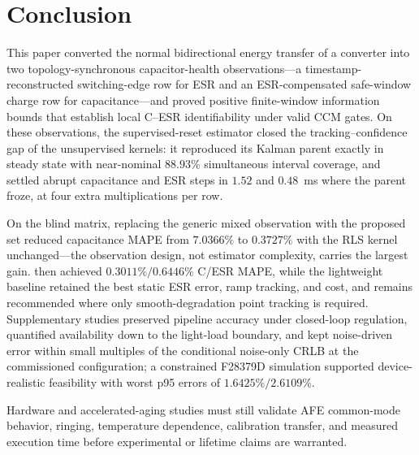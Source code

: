 \section{Conclusion}
\label{sec:conclusion}

This paper converted the normal bidirectional energy transfer of a \Cuk{} converter into two topology-synchronous capacitor-health observations---a timestamp-reconstructed switching-edge row for ESR and an ESR-compensated safe-window charge row for capacitance---and proved positive finite-window information bounds that establish local C--ESR identifiability under valid CCM gates. On these observations, the supervised-reset estimator \TSSRKE{} closed the tracking--confidence gap of the unsupervised kernels: it reproduced its Kalman parent exactly in steady state with near-nominal $88.93\%$ simultaneous interval coverage, and settled abrupt capacitance and ESR steps in $1.52$ and $0.48$~ms where the parent froze, at four extra multiplications per row.

On the blind matrix, replacing the generic mixed observation with the proposed set reduced capacitance MAPE from $7.0366\%$ to $0.3727\%$ with the RLS kernel unchanged---the observation design, not estimator complexity, carries the largest gain. \TSSRKE{} then achieved $0.3011\%/0.6446\%$ C/ESR MAPE, while the lightweight \TSRLS{} baseline retained the best static ESR error, ramp tracking, and cost, and remains recommended where only smooth-degradation point tracking is required. Supplementary studies preserved pipeline accuracy under closed-loop regulation, quantified availability down to the light-load boundary, and kept noise-driven error within small multiples of the conditional noise-only CRLB at the commissioned configuration; a constrained F28379D simulation supported device-realistic feasibility with worst p95 errors of $1.6425\%/2.6109\%$.

Hardware and accelerated-aging studies must still validate AFE common-mode behavior, ringing, temperature dependence, calibration transfer, and measured execution time before experimental or lifetime claims are warranted.
